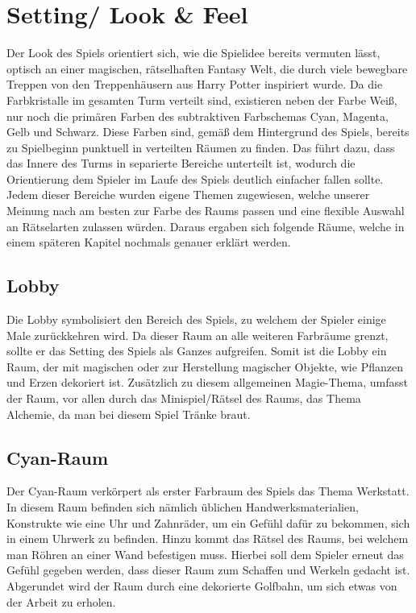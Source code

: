 \section{Setting/ Look \& Feel}
Der Look des Spiels orientiert sich, wie die Spielidee bereits vermuten lässt, optisch an einer magischen, rätselhaften Fantasy Welt, die durch viele bewegbare Treppen von den Treppenhäusern aus Harry Potter inspiriert wurde. Da die Farbkristalle im gesamten Turm verteilt sind, existieren neben der Farbe Weiß, nur noch die primären Farben des subtraktiven Farbschemas Cyan, Magenta, Gelb und Schwarz. Diese Farben sind, gemäß dem Hintergrund des Spiels, bereits zu Spielbeginn punktuell in verteilten Räumen zu finden. Das führt dazu, dass das Innere des Turms in separierte Bereiche unterteilt ist, wodurch die Orientierung dem Spieler im Laufe des Spiels deutlich einfacher fallen sollte. Jedem dieser Bereiche wurden eigene Themen zugewiesen, welche unserer Meinung nach am besten zur Farbe des Raums passen und eine flexible Auswahl an Rätselarten zulassen würden. Daraus ergaben sich folgende Räume, welche in einem späteren Kapitel nochmals genauer erklärt werden.
\newpage
\noindent
\subsection{Lobby}
Die Lobby symbolisiert den Bereich des Spiels, zu welchem der Spieler einige Male zurückkehren wird. Da dieser Raum an alle weiteren Farbräume grenzt, sollte er das Setting des Spiels als Ganzes aufgreifen. Somit ist die Lobby ein Raum, der mit magischen oder zur Herstellung magischer Objekte, wie Pflanzen und Erzen dekoriert ist. Zusätzlich zu diesem allgemeinen Magie-Thema, umfasst der Raum, vor allen durch das Minispiel/Rätsel des Raums, das Thema Alchemie, da man bei diesem Spiel Tränke braut.
\subsection{Cyan-Raum}
Der Cyan-Raum verkörpert als erster Farbraum des Spiels das Thema \dq Werkstatt\dq. In diesem Raum befinden sich nämlich üblichen Handwerksmaterialien, Konstrukte wie eine Uhr und Zahnräder, um ein Gefühl dafür zu bekommen, sich in einem Uhrwerk zu befinden. Hinzu kommt das Rätsel des Raums, bei welchem man Röhren an einer Wand befestigen muss. Hierbei soll dem Spieler erneut das Gefühl gegeben werden, dass dieser Raum zum Schaffen und Werkeln gedacht ist. Abgerundet wird der Raum durch eine dekorierte Golfbahn, um sich etwas von der Arbeit zu erholen.

